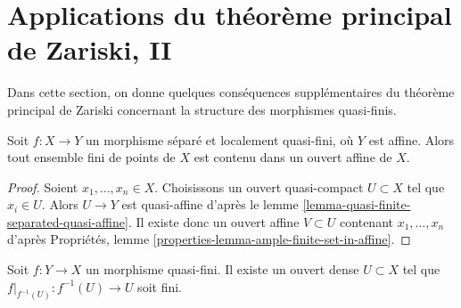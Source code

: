 \section{Applications du théorème principal de Zariski, II}
\label{section-applications-zmt-II}

\noindent
Dans cette section, on donne quelques conséquences supplémentaires du théorème principal de Zariski
concernant la structure des morphismes quasi-finis.

\begin{lemma}
\label{lemma-separated-locally-quasi-finite-over-affine}
Soit $f : X \to Y$ un morphisme séparé et localement quasi-fini,
où $Y$ est affine. Alors tout ensemble fini de points de $X$ est contenu
dans un ouvert affine de $X$.
\end{lemma}

\begin{proof}
Soient $x_1, \ldots, x_n \in X$. Choisissons un ouvert quasi-compact
$U \subset X$ tel que $x_i \in U$. Alors $U \to Y$ est quasi-affine d'après le
lemme \ref{lemma-quasi-finite-separated-quasi-affine}.
Il existe donc un ouvert affine $V \subset U$ contenant
$x_1, \ldots, x_n$ d'après
Propriétés, lemme \ref{properties-lemma-ample-finite-set-in-affine}.
\end{proof}

\begin{lemma}
\label{lemma-quasi-finite-finite-over-dense-open}
Soit $f : Y \to X$ un morphisme quasi-fini.
Il existe un ouvert dense $U \subset X$ tel que
$f|_{f^{-1}(U)} : f^{-1}(U) \to U$ soit fini.
\end{lemma}

